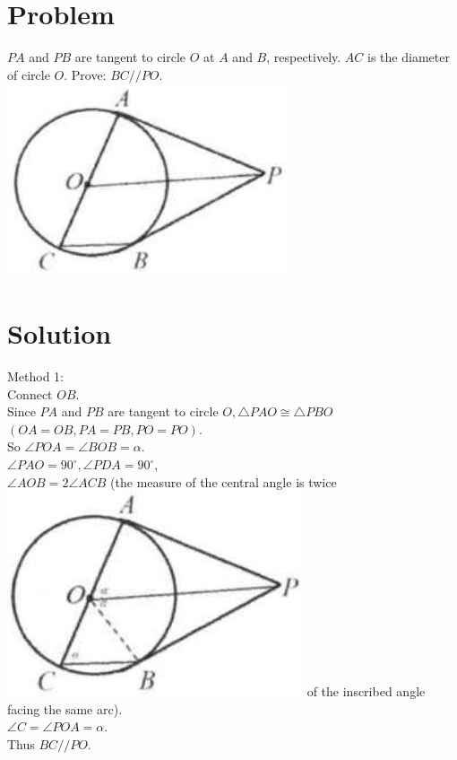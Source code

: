 \documentclass{article}
\begin{document}
\section*{Problem}
\(P A\) and \(P B\) are tangent to circle \(O\) at \(A\) and \(B\), respectively. \(A C\) is the diameter of circle \(O\). Prove: \(B C / / P O\).\\
\centering
\includegraphics[width=\textwidth]{images/154(2).jpg}

\section*{Solution}
Method 1:\\
Connect \(O B\).\\
Since \(P A\) and \(P B\) are tangent to circle \(O, \triangle P A O \cong \triangle P B O\) \((O A=O B, P A=P B, P O=P O)\).\\
So \(\angle P O A=\angle B O B=\alpha\).\\
\(\angle P A O=90^{\circ}, \angle P D A=90^{\circ}\),\\
\(\angle A O B=2 \angle A C B\) (the measure of the central angle is twice\\
\includegraphics[width=\textwidth]{images/157.jpg} of the inscribed angle facing the same arc).\\
\(\angle C=\angle P O A=\alpha\).\\
Thus \(B C / / P O\).
\end{document}

